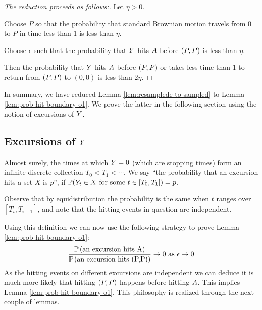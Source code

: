 {\begin{lemma}\label{lem:prob-hit-boundary-o1}
\end{lemma}

\newcommand{\origin}{(0,0)}

\begin{proof}[The reduction proceeds as follows:]

  Let $\eta > 0$.

  Choose $P$ so that the probability that standard Brownian motion
  travels from $0$ to $P$ in time less than $1$ is less than
  $\eta$.

  Choose $\epsilon$ such that the probability that $Y$ hits
  $A$ before $(P,P)$ is less than $\eta$.

  Then the probability that $Y$ hits $A$ before $(P,P)$
  or takes less time than $1$ to return from $(P,P)$ to $\origin$ is
  less than $2\eta$.
\end{proof}

In summary, we have reduced Lemma \ref{lem:resamplede-to-sampled} to
Lemma \ref{lem:prob-hit-boundary-o1}. We prove the latter in the
following section using the notion of excursions of $Y$.

\subsection{Excursions of $Y$}

\newcommand{\excursionstart}{T}
{
  Almost surely, the times at which $Y = 0$ (which are stopping
  times) form an infinite discrete collection $\excursionstart_0 <
  \excursionstart_1 < \cdots$. We say ``the probability that an excursion
  hits a set $X$ is $p$'', if $\P(\twodim_t\in X \text{
  for some } t\in [\excursionstart_0, \excursionstart_{1}]) = p$.

  Observe that by equidistribution the probability is the same when
  $t$ ranges over $[\excursionstart_i, \excursionstart_{i+1}]$, and
  note that the hitting events in question are independent.
}

\newcommand{\probexcursionhits}[1]{\P\left(\text{an excursion hits #1}\right)}

Using this definition we can now use the following strategy to
prove Lemma \ref{lem:prob-hit-boundary-o1}:
\[
\frac{\probexcursionhits{\boundarylines}}
     {\probexcursionhits{\farpoint}}
        \to 0 \text{ as } \epsilon\to0
\]
As the hitting events on different excursions are independent we
can deduce it is much more likely that hitting $(P,P)$ happens
before hitting $A$. This implies Lemma
\ref{lem:prob-hit-boundary-o1}. This philosophy is
realized through the next couple of lemmas.

}
